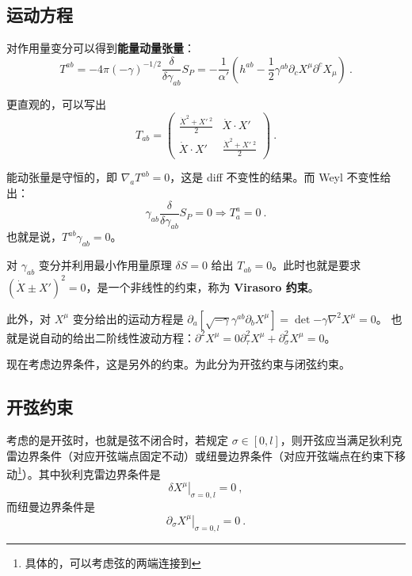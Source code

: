 

\subsection{运动方程}
对作用量变分可以得到\textbf{能量动量张量}：
\begin{equation}
	T^{ab} = - 4\pi (- \gamma)^{-1/2} \frac{\delta}{\delta \gamma_{ab}} S_P = -\frac{1}{\alpha'} (h^{ab} - \frac{1}{2} \gamma^{ab} \partial_c X^\mu \partial^c X_\mu) ~.
\end{equation}

更直观的，可以写出 
\begin{equation}
	T_{ab} = \left(\begin{matrix}
		\frac{\dot X^2 + X'~^2}{2} & \dot X \cdot X' \\
		\dot X \cdot X' & \frac{\dot X^2 + X'~^2}{2}
	\end{matrix}\right) ~.
\end{equation}

能动张量是守恒的，即 $\nabla_a T^{ab} = 0$，这是 diff 不变性的结果。而 Weyl 不变性给出：
\begin{equation}
	\gamma_{ab} \frac{\delta}{\delta \gamma_{ab}} S_P = 0 \Rightarrow T_a^a = 0 ~.
\end{equation}
也就是说，$T^{ab} \gamma_{ab} = 0$。

对 $\gamma_{ab}$ 变分并利用最小作用量原理 $\delta S = 0$ 给出 $T_{ab} = 0$。此时也就是要求 $(\dot X \pm X')^2 = 0$，是一个非线性的约束，称为\textbf{ Virasoro 约束}。

此外，对 $X^\mu$ 变分给出的运动方程是 $\partial_a [\sqrt{-\gamma} \gamma^{ab} \partial_b X^\mu] = \det{-\gamma} \nabla^2 X^\mu = 0$。 也就是说自动的给出二阶线性波动方程：$\partial^2 X^\mu = 0\partial_\tau^2 X^\mu + \partial_\sigma^2 X^\mu = 0$。

现在考虑边界条件，这是另外的约束。为此分为开弦约束与闭弦约束。

\subsection{开弦约束}
考虑的是开弦时，也就是弦不闭合时，若规定 $\sigma \in [0, l]$，则开弦应当满足狄利克雷边界条件（对应开弦端点固定不动）或纽曼边界条件（对应开弦端点在约束下移动\footnote{具体的，可以考虑弦的两端连接到}）。其中狄利克雷边界条件是 
\begin{equation}
	\left. \delta X^\mu \right|_{\sigma = 0, l} = 0~,
\end{equation}
而纽曼边界条件是 
\begin{equation}
	\left. \partial_\sigma X^\mu \right|_{\sigma = 0, l} = 0 ~.
\end{equation}


